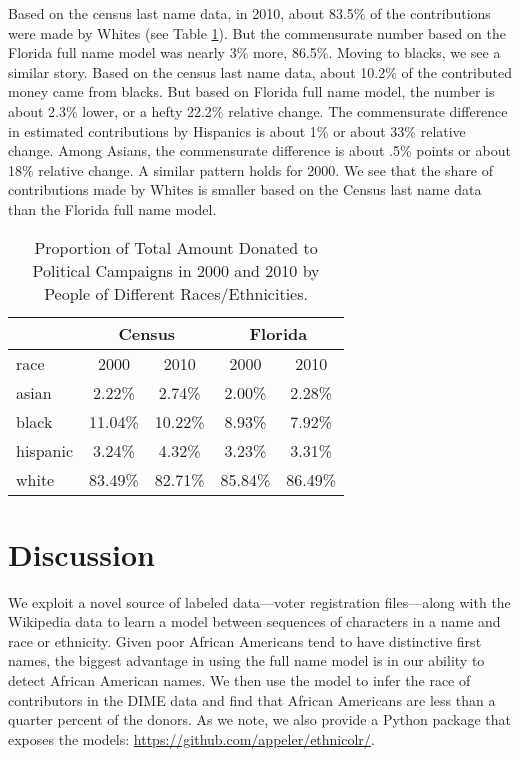 \documentclass[12pt, letterpaper]{article}
\begin{document}
Based on the census last name data, in 2010, about 83.5\% of the contributions were made by Whites (see Table \ref{table:percentage_contrib_by_race}). But the commensurate number based on the Florida full name model was nearly 3\% more, 86.5\%. Moving to blacks, we see a similar story. Based on the census last name data, about 10.2\% of the contributed money came from blacks. But based on Florida full name model, the number is about 2.3\% lower, or a hefty 22.2\% relative change. The commensurate difference in estimated contributions by Hispanics is about 1\% or about 33\% relative change. Among Asians, the commensurate difference is about .5\% points or about 18\% relative change. A similar pattern holds for 2000. We see that the share of contributions made by Whites is smaller based on the Census last name data than the Florida full name model.

\begin{table}[h!]
\centering
\caption{Proportion of Total Amount Donated to Political Campaigns in 2000 and 2010 by People of Different Races/Ethnicities.}
\begin{tabular}{ l c c c c}
\hline
         & \multicolumn{2}{c}{Census} & \multicolumn{2}{c}{Florida}\\
\hline
race     &     2000     & 2010     &    2000    & 2010\\    
\hline
asian    &     2.22\%   & 2.74\%   &   2.00\%   & 2.28\%\\
black    &     11.04\%  & 10.22\%  &   8.93\%   & 7.92\%\\
hispanic &     3.24\%   & 4.32\%   &   3.23\%   & 3.31\%\\
white    &     83.49\%  & 82.71\%  &   85.84\%  & 86.49\%\\
\hline
\end{tabular}
\label{table:percentage_contrib_by_race}
\end{table}

\section*{Discussion}
We exploit a novel source of labeled data---voter registration files---along with the Wikipedia data to learn a model between sequences of characters in a name and race or ethnicity. Given poor African Americans tend to have distinctive first names, the biggest advantage in using the full name model is in our ability to detect African American names. We then use the model to infer the race of contributors in the DIME data and find that African Americans are less than a quarter percent of the donors. As we note, we also provide a Python package that exposes the models: \url{https://github.com/appeler/ethnicolr/}.
\end{document}
